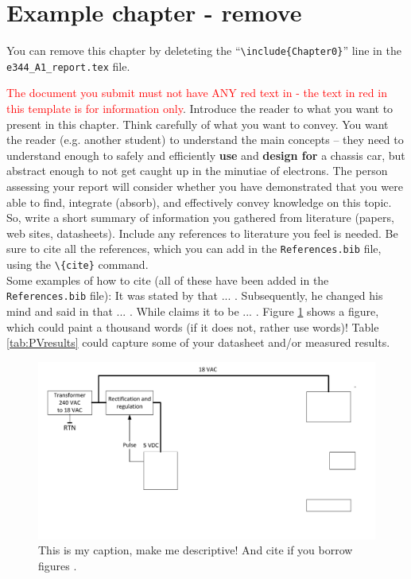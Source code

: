 \chapter*{Example chapter - remove}\label{chap:Example}

You can remove this chapter by deleteting the ``\texttt{\textbackslash include\{Chapter0\}}'' line in the \texttt{e344\_A1\_report.tex} file.  

\textcolor{red}{The document you submit must not have ANY red text in - the text in red in this template is for information only}. 
Introduce the reader to what you want to present in this chapter. 
Think carefully of what you want to convey. You want the reader (e.g. another student) to understand the main concepts -- they need to understand enough to safely and efficiently \textbf{use} and \textbf{design for} a chassis car, but abstract enough to not get caught up in the minutiae of electrons. The person assessing your report will consider whether you have demonstrated that you were able to find, integrate (absorb), and effectively convey knowledge on this topic.   So, write a short summary of information you gathered from literature (papers, web sites, datasheets). Include any references to literature you feel is needed. Be sure to cite all the references, which you can add in the \texttt{References.bib} file, using the \texttt{\textbackslash\{cite\}} command.\\

\noindent Some examples of how to cite (all of these have been added in the  \texttt{References.bib} file): 
It was stated by \cite{Booysen:2013} that ... . Subsequently, he changed his mind and said in  \cite{Gerber:2019} that ... .
While \cite{WebsiteOpAmp} claims it to be ... .
Figure \ref{fig:someName} shows a figure, which could paint a thousand words (if it does not, rather use words)! Table \ref{tab:PVresults} could capture some of your datasheet and/or measured results.

\begin{figure}[!htb]
\centering
\includegraphics[width=0.5\linewidth]{Figures/PowerSystemDiagram.pdf}
\caption[This is my caption, make me descriptive!]{This is my caption, make me descriptive! And cite if you borrow figures \cite{WebsiteOpAmp}.}
\label{fig:someName}
\end{figure}

